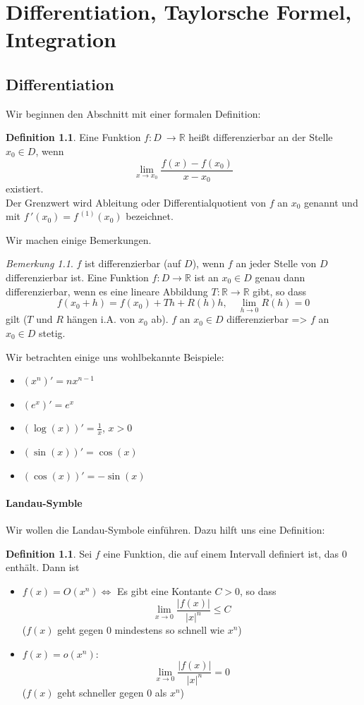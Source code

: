 \documentclass[fontsize=12pt,paper=a4,twoside,bibtotoc,idxtotoc,
liststotoc,pagesize,BCOR1.2cm,DIV15,chapterprefix,pagesize=pdftex]{scrbook}
\theoremstyle{plain}
\theoremstyle{definition}
\newtheorem{df}[equation]{Definition}
\theoremstyle{remark}
\newtheorem{bem}[equation]{Bemerkung}
\begin{document}
\chapter{Differentiation, Taylorsche Formel, Integration}
\section{Differentiation}
Wir beginnen den Abschnitt mit einer formalen Definition:
\begin{df}
Eine Funktion $f: D \ \rightarrow \mathbb{R}$ heißt differenzierbar an
der Stelle $x_0 \in D$, wenn 
\[ \lim_{x \rightarrow x_0} \frac{f(x)-f(x_0)}{x -x_0} \]
existiert. \\
Der Grenzwert wird Ableitung oder Differentialquotient
von $f$ an $x_0$ genannt und mit $f\,'(x_0)=f^{\,(1)} (x_0)$ bezeichnet.
\end{df}
Wir machen einige Bemerkungen.
\begin{bem}
 $f$ ist differenzierbar (auf $D$), wenn $f$ an jeder
Stelle von $D$ differenzierbar ist. 
 Eine Funktion $f:D \rightarrow \mathbb{R}$ ist an $x_0 \in D$
genau dann differenzierbar, wenn es eine lineare Abbildung
$T:\mathbb{R} \rightarrow \mathbb{R}$ gibt, so dass 
\[ f(x_0+h)=f(x_0) +Th + R(h)h, \quad \lim_{h \rightarrow 0} R(h)=0 \]
gilt ($T$ und $R$ hängen i.A. von $x_0$ ab). 
 $f$ an $x_0 \in D$ differenzierbar => $f$ an $x_0 \in D$ stetig.
\end{bem}
Wir betrachten einige uns wohlbekannte Beispiele:
\begin{itemize}
\item $(x^n)'=n x^{n-1}$
\item $(e^x)'=e^x$
\item $(\log(x))'= \frac{1}{x}$, $x>0$
\item $(\sin(x))'=\cos(x)$
\item $(\cos(x))'=-\sin(x)$
\end{itemize}
\subsubsection{Landau-Symble}
Wir wollen die Landau-Symbole einführen. Dazu hilft uns eine Definition:
\begin{df}
Sei $f$ eine Funktion, die auf einem Intervall definiert ist, das $0$
enthält. Dann ist 
\begin{itemize}
\item  $f(x)=O(x^n)\Longleftrightarrow$ Es gibt eine Kontante $C >0$, so dass
\[  \lim_{x \rightarrow 0} \frac{|f(x)|}{|x|^n} \leq C\]
($f(x)$ geht gegen $0$ mindestens so schnell wie $x^n$)
\item $f(x)=o(x^n)$: 
\[  
 \lim_{x \rightarrow 0} \frac{|f(x)|}{|x|^n}=0
\]
($f(x)$ geht schneller gegen $0$ als $x^n$)
\end{itemize}
\end{df}
\end{document}
